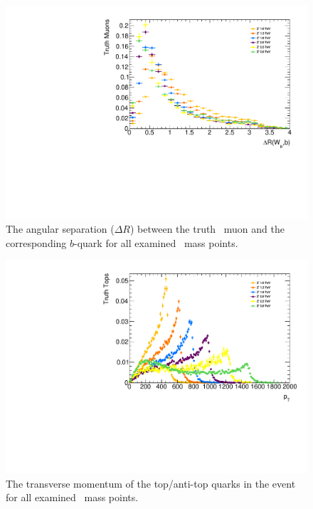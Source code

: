 \begin{figure}[t]
\includegraphics[width=\textwidth]{PartBoosted/Plots/h_trmu_b_dr.pdf}
\caption{The angular separation ($\Delta R$) between the truth \W\ muon and the corresponding $b$-quark for all examined \Zprime\ mass points.} \label{fig:ExampleCollimation}
\end{figure}

\begin{figure}[t]
\includegraphics[width=\textwidth]{PartBoosted/Plots/h_trtop_pt.pdf}
\caption{The transverse momentum of the top/anti-top quarks in the event for all examined \Zprime\ mass points.} \label{fig:ExampleBoost}
\end{figure}


